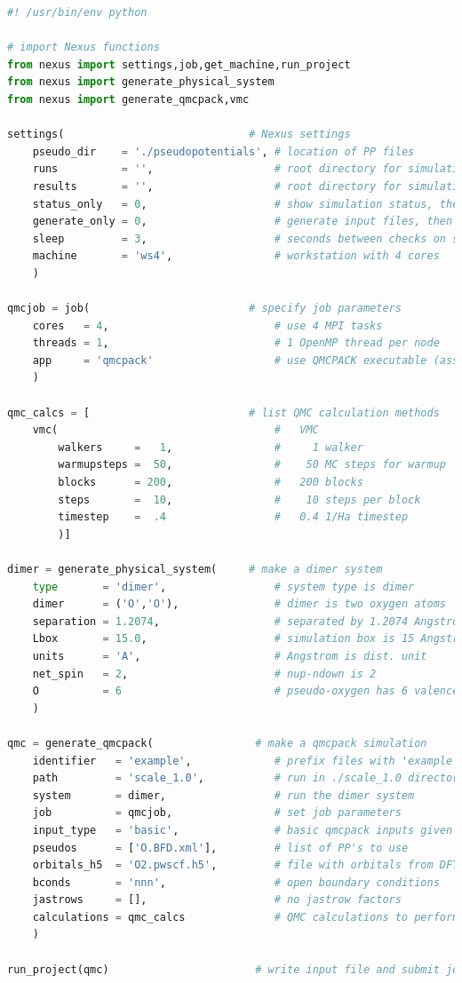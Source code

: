 \ifws
\begin{lstlisting}[language=Python]
#! /usr/bin/env python

# import Nexus functions
from nexus import settings,job,get_machine,run_project 
from nexus import generate_physical_system
from nexus import generate_qmcpack,vmc

settings(                             # Nexus settings
    pseudo_dir    = './pseudopotentials', # location of PP files
    runs          = '',                   # root directory for simulations
    results       = '',                   # root directory for simulation results
    status_only   = 0,                    # show simulation status, then exit
    generate_only = 0,                    # generate input files, then exit
    sleep         = 3,                    # seconds between checks on sim. progress
    machine       = 'ws4',                # workstation with 4 cores
    ) 

qmcjob = job(                         # specify job parameters
    cores   = 4,                          # use 4 MPI tasks
    threads = 1,                          # 1 OpenMP thread per node
    app     = 'qmcpack'                   # use QMCPACK executable (assumed in PATH)
    )

qmc_calcs = [                         # list QMC calculation methods
    vmc(                                  #   VMC
        walkers     =   1,                #     1 walker
        warmupsteps =  50,                #    50 MC steps for warmup
        blocks      = 200,                #   200 blocks
        steps       =  10,                #    10 steps per block
        timestep    =  .4                 #   0.4 1/Ha timestep
        )]

dimer = generate_physical_system(     # make a dimer system
    type       = 'dimer',                 # system type is dimer
    dimer      = ('O','O'),               # dimer is two oxygen atoms
    separation = 1.2074,                  # separated by 1.2074 Angstrom
    Lbox       = 15.0,                    # simulation box is 15 Angstrom 
    units      = 'A',                     # Angstrom is dist. unit
    net_spin   = 2,                       # nup-ndown is 2
    O          = 6                        # pseudo-oxygen has 6 valence el.
    )

qmc = generate_qmcpack(                # make a qmcpack simulation 
    identifier   = 'example',             # prefix files with 'example'
    path         = 'scale_1.0',           # run in ./scale_1.0 directory
    system       = dimer,                 # run the dimer system
    job          = qmcjob,                # set job parameters
    input_type   = 'basic',               # basic qmcpack inputs given below    
    pseudos      = ['O.BFD.xml'],         # list of PP's to use
    orbitals_h5  = 'O2.pwscf.h5',         # file with orbitals from DFT
    bconds       = 'nnn',                 # open boundary conditions
    jastrows     = [],                    # no jastrow factors
    calculations = qmc_calcs              # QMC calculations to perform
    )
                       
run_project(qmc)                       # write input file and submit job
\end{lstlisting}

